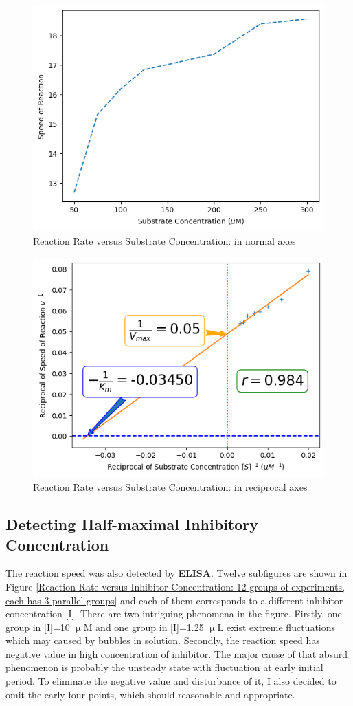 \documentclass{report}
\begin{document}
\begin{figure}
    \centering
    \includegraphics[width=0.5\linewidth]{../Figures/substrate2.png}
    \caption{Reaction Rate versus Substrate Concentration: in normal axes}
    \label{Reaction Rate versus Substrate Concentration: in normal axes}
\end{figure}

\begin{figure}
    \centering
    \includegraphics[width=1\linewidth]{../Figures/substrate3.png}
    \caption{Reaction Rate versus Substrate Concentration: in reciprocal axes}
    \label{Reaction Rate versus Substrate Concentration: in reciprocall axes}
\end{figure}

\subsection{Detecting Half-maximal Inhibitory Concentration}
The reaction speed was also detected by \textbf{ELISA}.
Twelve subfigures are shown in Figure \ref{Reaction Rate versus Inhibitor Concentration: 12 groups of experiments, each has 3 parallel groups} and each of them corresponds to a different inhibitor concentration [I].
There are two intriguing phenomena in the figure.
Firstly, one group in [I]=10 $\upmu$M and one group in [I]=1.25 $\upmu$L exist extreme fluctuations which may caused by bubbles in solution.
Secondly, the reaction speed has negative value in high concentration of inhibitor.
The major cause of that absurd phenomenon is probably the unsteady state with fluctuation at early initial period.
To eliminate the negative value and disturbance of it, I also decided to omit the early four points, which should reasonable and appropriate.
\end{document}
